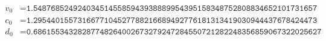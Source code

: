 \begin{equation}
\begin{aligned}
v_0&=\texttt{1.5487685249240345145585943938889954395158348752808834652101731657}\\
c_0&=\texttt{1.2954401557316677104527788216689492776181313419030944437678424473}\\
d_0&=\texttt{0.68615534328287748264002673279247284550721282248356859067322025627}
\end{aligned}
\label{eq:center}
\end{equation}
